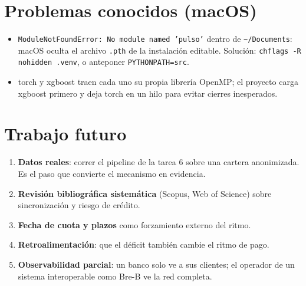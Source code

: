 \section{Problemas conocidos (macOS)}
\begin{itemize}
\item \texttt{ModuleNotFoundError: No module named 'pulso'} dentro de
\texttt{\textasciitilde/Documents}: macOS oculta el archivo \texttt{.pth} de la
instalación editable. Solución: \texttt{chflags -R nohidden .venv}, o anteponer
\texttt{PYTHONPATH=src}.
\item torch y xgboost traen cada uno su propia librería OpenMP; el proyecto carga
xgboost primero y deja torch en un hilo para evitar cierres inesperados.
\end{itemize}

\section{Trabajo futuro}
\begin{enumerate}
\item \textbf{Datos reales}: correr el pipeline de la tarea 6 sobre una cartera
anonimizada. Es el paso que convierte el mecanismo en evidencia.
\item \textbf{Revisión bibliográfica sistemática} (Scopus, Web of Science) sobre
sincronización y riesgo de crédito.
\item \textbf{Fecha de cuota y plazos} como forzamiento externo del ritmo.
\item \textbf{Retroalimentación}: que el déficit también cambie el ritmo de pago.
\item \textbf{Observabilidad parcial}: un banco solo ve a sus clientes; el operador de
un sistema interoperable como Bre-B ve la red completa.
\end{enumerate}
